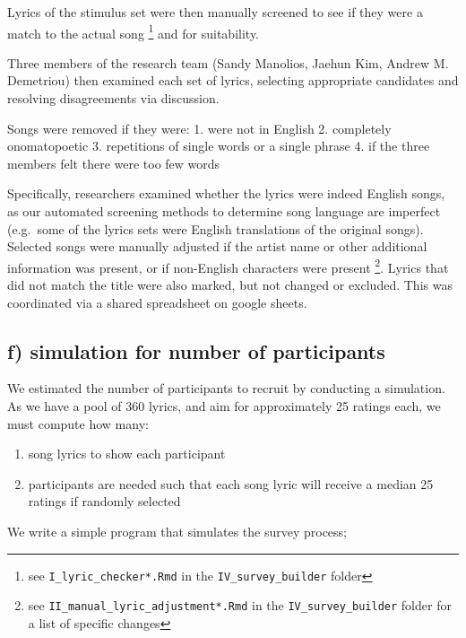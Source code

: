 \documentclass[
  letterpaper,
  DIV=11,
  numbers=noendperiod]{scrartcl}
\providecommand{\tightlist}{%
  \setlength{\itemsep}{0pt}\setlength{\parskip}{0pt}}\usepackage{longtable,booktabs,array}
\begin{document}
Lyrics of the stimulus set were then manually screened to see if they
were a match to the actual song \footnote{see
  \texttt{I\_lyric\_checker*.Rmd} in the \texttt{IV\_survey\_builder}
  folder} and for suitability.

Three members of the research team (Sandy Manolios, Jaehun Kim, Andrew
M. Demetriou) then examined each set of lyrics, selecting appropriate
candidates and resolving disagreements via discussion.

Songs were removed if they were: 1. were not in English 2. completely
onomatopoetic 3. repetitions of single words or a single phrase 4. if
the three members felt there were too few words

Specifically, researchers examined whether the lyrics were indeed
English songs, as our automated screening methods to determine song
language are imperfect (e.g.~some of the lyrics sets were English
translations of the original songs). Selected songs were manually
adjusted if the artist name or other additional information was present,
or if non-English characters were present \footnote{see
  \texttt{II\_manual\_lyric\_adjustment*.Rmd} in the
  \texttt{IV\_survey\_builder} folder for a list of specific changes}.
Lyrics that did not match the title were also marked, but not changed or
excluded. This was coordinated via a shared spreadsheet on google
sheets.

\hypertarget{sec-participantsimulation}{%
\subsection{f) simulation for number of
participants}\label{sec-participantsimulation}}

We estimated the number of participants to recruit by conducting a
simulation. As we have a pool of 360 lyrics, and aim for approximately
25 ratings each, we must compute how many:

\begin{enumerate}
\def\labelenumi{\arabic{enumi}.}
\tightlist
\item
  song lyrics to show each participant
\item
  participants are needed such that each song lyric will receive a
  median 25 ratings if randomly selected
\end{enumerate}

We write a simple program that simulates the survey process;
\end{document}
